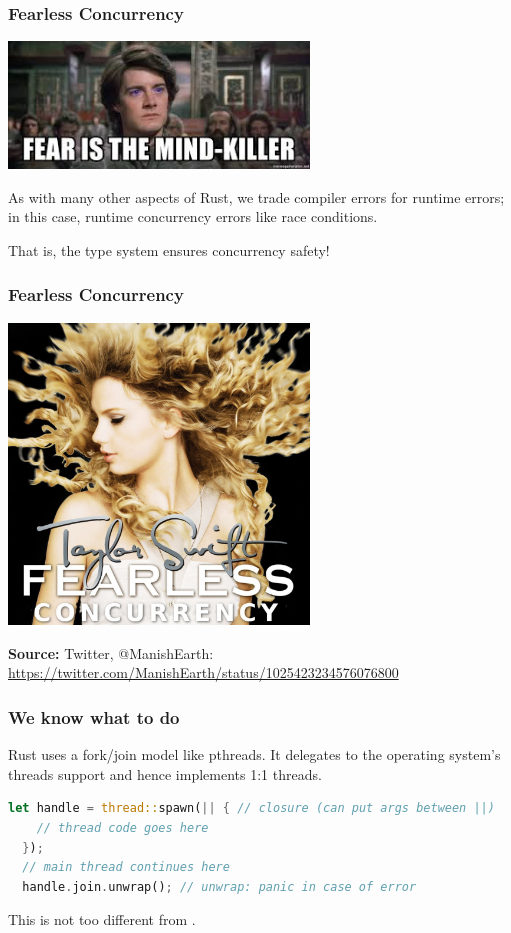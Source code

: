 \begin{frame}
\frametitle{Fearless Concurrency}
\begin{center}
	\includegraphics[width=0.6\textwidth]{images/mindkiller.jpeg}
\end{center}

As with many other aspects of Rust, we trade compiler errors for runtime
errors; in this case, runtime concurrency errors like race conditions.


That is, the type system ensures concurrency safety!

\end{frame}


\begin{frame}
\frametitle{Fearless Concurrency}
\begin{center}
	\includegraphics[width=0.6\textwidth]{images/fearless-concurrency.jpg}
\end{center}

\textbf{Source: } Twitter, @ManishEarth: \url{https://twitter.com/ManishEarth/status/1025423234576076800}

\end{frame}


\begin{frame}[fragile]
\frametitle{We know what to do}

Rust uses a fork/join model like pthreads. It delegates to the operating
system's threads support and hence implements 1:1 threads.
\begin{lstlisting}[language=Rust]
  let handle = thread::spawn(|| { // closure (can put args between ||)
    // thread code goes here
  });
  // main thread continues here
  handle.join.unwrap(); // unwrap: panic in case of error
\end{lstlisting}
This is not too different from \CPP.


\end{frame}


